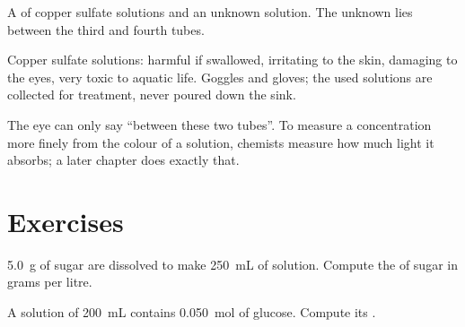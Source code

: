 \begin{omfigure}

{\small A  of copper sulfate solutions and an unknown
solution. The unknown lies between the third and fourth tubes.}
\end{omfigure}

\begin{safety}{}
Copper sulfate solutions: harmful if swallowed, irritating to the skin,
damaging to the eyes, very toxic to aquatic life. Goggles and gloves; the
used solutions are collected for treatment, never poured down the sink.
\end{safety}

\begin{remark}\label{rem:g10:concentration-and-dilution:eye}
The eye can only say ``between these two tubes''. To measure a
concentration more finely from the colour of a solution, chemists
measure how much light it absorbs; a later chapter does exactly that.
\end{remark}

\section{Exercises}

\begin{exercise}[$\star$]\label{exo:g10:concentration-and-dilution:1}
\qty{5.0}{g} of sugar are dissolved to make \qty{250}{mL} of solution.
Compute the  of sugar in grams per litre.
\end{exercise}

\begin{exercise}[$\star$]\label{exo:g10:concentration-and-dilution:2}
A solution of \qty{200}{mL} contains \qty{0.050}{mol} of glucose.
Compute its .
\end{exercise}

